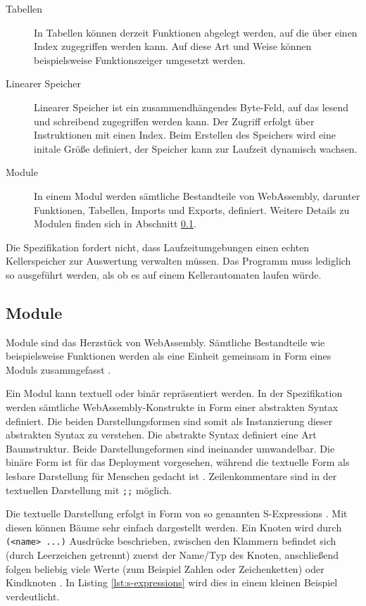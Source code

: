 \begin{description}
    \item[Tabellen] In Tabellen können derzeit Funktionen abgelegt werden, auf die über einen Index zugegriffen werden kann. Auf diese Art und Weise können beispielsweise Funktionszeiger umgesetzt werden. 
    \item[Linearer Speicher] Linearer Speicher ist ein zusammendhängendes Byte-Feld, auf das lesend und schreibend zugegriffen werden kann. Der Zugriff erfolgt über Instruktionen mit einen Index. Beim Erstellen des Speichers wird eine initale Größe definiert, der Speicher kann zur Laufzeit dynamisch wachsen.
    \item[Module] In einem Modul werden sämtliche Bestandteile von WebAssembly, darunter Funktionen, Tabellen, Imports und Exports, definiert. Weitere Details zu Modulen finden sich in Abschnitt \ref{subsec:WebAssembly-Module}.
\end{description}

Die Spezifikation fordert nicht, dass Laufzeitumgebungen einen echten Kellerspeicher zur Auswertung verwalten müssen. Das Programm muss lediglich so ausgeführt werden, als ob es auf einem Kellerautomaten laufen würde.

\subsection{Module}
\label{subsec:WebAssembly-Module}
Module sind das Herzstück von WebAssembly. Sämtliche Bestandteile wie beispielsweise Funktionen werden als eine Einheit gemeinsam in Form eines Moduls zusammgefasst \cite{WebAssemblySpecification}.

Ein Modul kann textuell oder binär repräsentiert werden. In der Spezifikation werden sämtliche WebAssembly-Konstrukte in Form einer abstrakten Syntax definiert. Die beiden Darstellungsformen sind somit als Instanzierung dieser abstrakten Syntax zu verstehen. Die abstrakte Syntax definiert eine Art Baumstruktur. Beide Darstellungeformen sind ineinander umwandelbar. Die binäre Form ist für das Deployment vorgesehen, während die textuelle Form als lesbare Darstellung für Menschen gedacht ist \cite{WebAssemblySpecification} \cite{MDNWebAssembly}. Zeilenkommentare sind in der textuellen Darstellung mit \lstinline{;;} möglich.

Die textuelle Darstellung erfolgt in Form von so genannten S-Expressions \cite{WebAssemblySpecification}. Mit diesen können Bäume sehr einfach dargestellt werden. Ein Knoten wird durch \lstinline{(<name> ...)} Ausdrücke beschrieben, zwischen den Klammern befindet sich (durch Leerzeichen getrennt) zuerst der Name/Typ des Knoten, anschließend folgen beliebig viele Werte (zum Beispiel Zahlen oder Zeichenketten) oder Kindknoten \cite{MDNWebAssembly}. In Listing \ref{lst:s-expressions} wird dies in einem kleinen Beispiel verdeutlicht.

